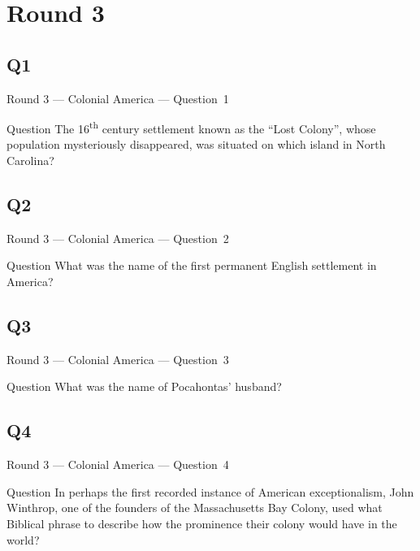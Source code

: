 \documentclass[11pt]{beamer}
\begin{document}
\section{Round 3}
\subsection*{Q1}
\begin{frame}[t]{Round 3 --- Colonial America --- \mbox{Question 1}}
    \vspace{-0.5em}
    \begin{block}{Question}
        The 16\textsuperscript{th} century settlement known as the ``Lost Colony'', whose population mysteriously disappeared, was situated on which island in North Carolina?
    \end{block}
\end{frame}
\subsection*{Q2}
\begin{frame}[t]{Round 3 --- Colonial America --- \mbox{Question 2}}
    \vspace{-0.5em}
    \begin{block}{Question}
        What was the name of the first permanent English settlement in America?
    \end{block}
\end{frame}
\subsection*{Q3}
\begin{frame}[t]{Round 3 --- Colonial America --- \mbox{Question 3}}
    \vspace{-0.5em}
    \begin{block}{Question}
        What was the name of Pocahontas' husband?
    \end{block}
\end{frame}
\subsection*{Q4}
\begin{frame}[t]{Round 3 --- Colonial America --- \mbox{Question 4}}
    \vspace{-0.5em}
    \begin{block}{Question}
        In perhaps the first recorded instance of American exceptionalism, John Winthrop, one of the founders of the Massachusetts Bay Colony, used what Biblical phrase to describe how the prominence their colony would have in the world?
    \end{block}
\end{frame}
\end{document}
